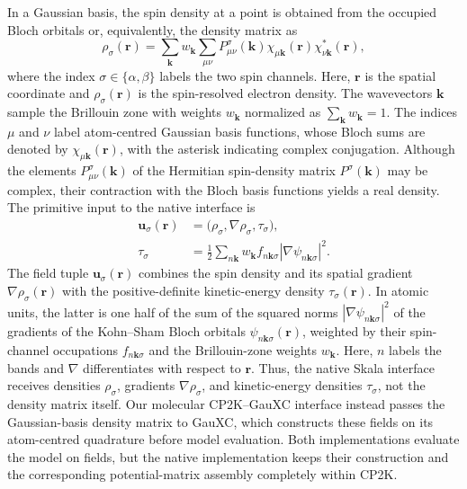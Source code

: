 \documentclass[10pt,a4paper,twocolumn]{article}
\newcommand{\uvec}{\boldsymbol{u}}
\begin{document}
In a Gaussian basis, the spin density at a point is obtained from the occupied Bloch orbitals or, equivalently, the density matrix as
\begin{equation}
 \rho_\sigma(\mathbf r)=\sum_{\mathbf k}w_{\mathbf k}
 \sum_{\mu\nu}P^\sigma_{\mu\nu}(\mathbf k)
 \chi_{\mu\mathbf k}(\mathbf r)\chi^*_{\nu\mathbf k}(\mathbf r),
 \label{eq:rho}
\end{equation}
where the index $\sigma\in\{\alpha,\beta\}$ labels the two spin channels. Here, $\mathbf r$ is the spatial coordinate and $\rho_\sigma(\mathbf r)$ is the spin-resolved electron density. The wavevectors $\mathbf k$ sample the Brillouin zone with weights $w_{\mathbf k}$ normalized as $\sum_{\mathbf k}w_{\mathbf k}=1$. The indices $\mu$ and $\nu$ label atom-centred Gaussian basis functions, whose Bloch sums are denoted by $\chi_{\mu\mathbf k}(\mathbf r)$, with the asterisk indicating complex conjugation. Although the elements $P^\sigma_{\mu\nu}(\mathbf k)$ of the Hermitian spin-density matrix $P^\sigma(\mathbf k)$ may be complex, their contraction with the Bloch basis functions yields a real density. The primitive input to the native interface is
\begin{equation}
 \begin{aligned}
 \uvec_\sigma(\mathbf r)&=\big(\rho_\sigma,\nabla\rho_\sigma,\tau_\sigma\big),\\
 \tau_\sigma&=\tfrac12\sum_{n\mathbf k}w_{\mathbf k}f_{n\mathbf k\sigma}
 |\nabla\psi_{n\mathbf k\sigma}|^2.
 \end{aligned}
 \label{eq:primitive}
\end{equation}
The field tuple $\uvec_\sigma(\mathbf r)$ combines the spin density and its spatial gradient $\nabla\rho_\sigma(\mathbf r)$ with the positive-definite kinetic-energy density $\tau_\sigma(\mathbf r)$. In atomic units, the latter is one half of the sum of the squared norms $|\nabla\psi_{n\mathbf k\sigma}|^2$ of the gradients of the Kohn--Sham Bloch orbitals $\psi_{n\mathbf k\sigma}(\mathbf r)$, weighted by their spin-channel occupations $f_{n\mathbf k\sigma}$ and the Brillouin-zone weights $w_{\mathbf k}$. Here, $n$ labels the bands and $\nabla$ differentiates with respect to $\mathbf r$.
Thus, the native Skala interface receives densities $\rho_\sigma$, gradients $\nabla\rho_\sigma$, and kinetic-energy densities $\tau_\sigma$, not the density matrix itself. Our molecular CP2K--GauXC interface instead passes the Gaussian-basis density matrix to GauXC, which constructs these fields on its atom-centred quadrature before model evaluation.\cite{Poeschel2026MolecularSkala,Williams2020} Both implementations evaluate the model on fields, but the native implementation keeps their construction and the corresponding potential-matrix assembly completely within CP2K.
\end{document}
